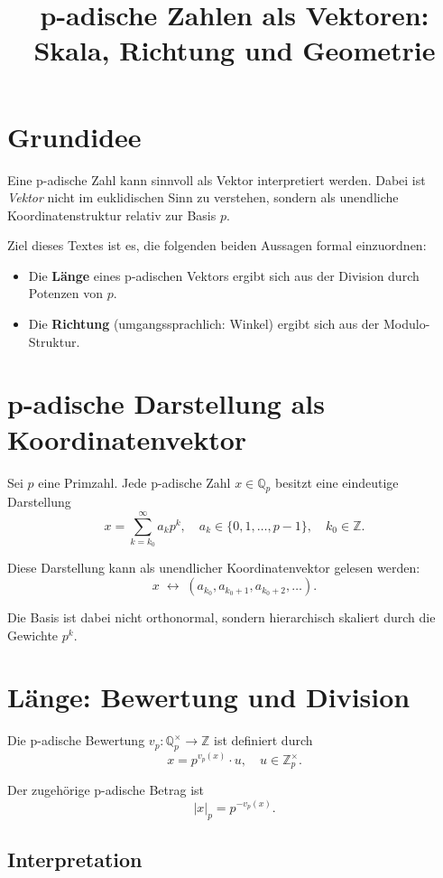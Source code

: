 \documentclass[12pt]{article}
\title{p-adische Zahlen als Vektoren: Skala, Richtung und Geometrie}
\author{}
\date{}
\begin{document}
\maketitle

\section{Grundidee}

Eine p-adische Zahl kann sinnvoll als Vektor interpretiert werden.
Dabei ist \emph{Vektor} nicht im euklidischen Sinn zu verstehen, sondern
als unendliche Koordinatenstruktur relativ zur Basis \(p\).

Ziel dieses Textes ist es, die folgenden beiden Aussagen formal einzuordnen:
\begin{itemize}
  \item Die \textbf{Länge} eines p-adischen Vektors ergibt sich aus der Division durch Potenzen von \(p\).
  \item Die \textbf{Richtung} (umgangssprachlich: Winkel) ergibt sich aus der Modulo-Struktur.
\end{itemize}

\section{p-adische Darstellung als Koordinatenvektor}

Sei \(p\) eine Primzahl. Jede p-adische Zahl \(x \in \mathbb{Q}_p\) besitzt eine eindeutige Darstellung
\[
x = \sum_{k = k_0}^{\infty} a_k p^k,
\quad a_k \in \{0,1,\dots,p-1\}, \quad k_0 \in \mathbb{Z}.
\]

Diese Darstellung kann als unendlicher Koordinatenvektor gelesen werden:
\[
x \;\longleftrightarrow\; (a_{k_0}, a_{k_0+1}, a_{k_0+2}, \dots).
\]

Die Basis ist dabei nicht orthonormal, sondern hierarchisch skaliert durch die Gewichte \(p^k\).

\section{Länge: Bewertung und Division}

Die p-adische Bewertung \(v_p : \mathbb{Q}_p^\times \to \mathbb{Z}\) ist definiert durch
\[
x = p^{v_p(x)} \cdot u,
\quad u \in \mathbb{Z}_p^\times.
\]

Der zugehörige p-adische Betrag ist
\[
|x|_p = p^{-v_p(x)}.
\]

\subsection*{Interpretation}
\end{document}
